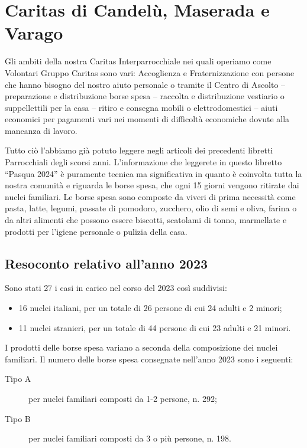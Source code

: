 \section{Caritas di Candelù, Maserada e Varago}

Gli ambiti della nostra Caritas Interparrocchiale nei quali operiamo come Volontari Gruppo Caritas sono vari: Accoglienza e Fraternizzazione con persone che hanno bisogno del nostro aiuto personale o tramite il Centro di Ascolto -- preparazione e distribuzione borse spesa -- raccolta e distribuzione vestiario o suppellettili per la casa -- ritiro e consegna mobili o elettrodomestici -- aiuti economici per pagamenti vari nei momenti di difficoltà economiche dovute alla mancanza di lavoro.

Tutto ciò l’abbiamo già potuto leggere negli articoli dei precedenti libretti Parrocchiali degli scorsi anni.
L’informazione che leggerete in questo libretto “Pasqua 2024” è puramente tecnica ma significativa in quanto è coinvolta tutta la nostra comunità e riguarda le borse spesa, che ogni 15 giorni vengono ritirate dai nuclei familiari. Le borse spesa sono composte da viveri di prima necessità come pasta, latte, legumi, passate di pomodoro, zucchero, olio di semi e oliva, farina o da altri alimenti che possono essere biscotti, scatolami di tonno, marmellate e prodotti per l’igiene personale o pulizia della casa.

\subsection{Resoconto relativo all’anno 2023}
Sono stati 27 i casi in carico nel corso del 2023 così suddivisi:
\begin{itemize}
	\item 16 nuclei italiani, per un totale di 26 persone di cui 24 adulti e 2 minori;
	\item 11 nuclei stranieri, per un totale di 44 persone di cui 23 adulti e 21 minori.
\end{itemize}

I prodotti delle borse spesa variano a seconda della composizione dei nuclei familiari. Il numero delle borse spesa consegnate nell’anno 2023 sono i seguenti:
\begin{description}
	\item[Tipo A] per nuclei familiari composti da 1-2 persone, n. 292;
	\item[Tipo B] per nuclei familiari composti da 3 o più persone, n. 198.
\end{description}

